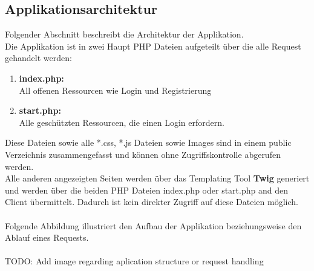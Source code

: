 \documentclass[11pt, a4paper, twoside]{article}   	%
\begin{document}
\subsection{Applikationsarchitektur}
Folgender Abschnitt beschreibt die Architektur der Applikation.\\
Die Applikation ist in zwei Haupt PHP Dateien aufgeteilt über die alle Request gehandelt werden:
\begin{enumerate}
	\item \textbf{index.php:} \\
	All offenen Ressourcen wie Login und Registrierung 
	\item \textbf{start.php:} \\
	Alle geschützten Ressourcen, die einen Login erfordern.
\end{enumerate}
Diese Dateien sowie alle *.css, *.js Dateien sowie Images sind in einem public Verzeichnis zusammengefasst und können ohne Zugriffskontrolle abgerufen werden.\\
Alle anderen angezeigten Seiten werden über das Templating Tool \textbf{Twig} generiert und werden über die beiden PHP Dateien index.php oder start.php and den Client übermittelt. Dadurch ist kein direkter Zugriff auf diese Dateien möglich. \\\\
Folgende Abbildung illustriert den Aufbau der Applikation beziehungsweise den Ablauf eines Requests. \\
\\
TODO: Add image regarding aplication structure or request handling 
\end{document}

